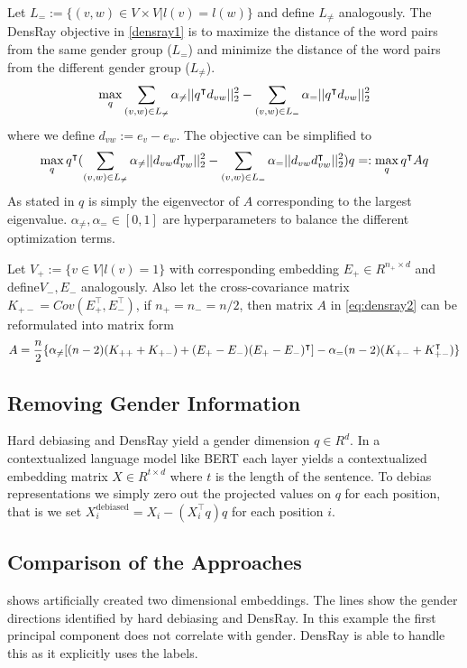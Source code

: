 Let $L_{=}:=\{(v,w)\in V\times V|l(v)=l(w)\}$ and define
$L_{\neq}$ analogously.  The DensRay objective
in \eqref{densray1} is to maximize the distance of the word
pairs from the same gender group ($L_{=}$) and minimize the
distance of the word pairs from the different gender group
($L_{\neq}$).
\begin{eqnarray}
\max\limits_{q} 
\sum_{(v,w)\in L_{\neq}}\alpha_{\neq}||q^\intercal d_{vw}||^2_2
-\sum_{(v,w)\in L_{=}}\alpha_{=}||q^\intercal d_{vw}||^2_2
\eqlabel{densray1}
\end{eqnarray}
where we define $d_{vw}:=e_v-e_w$. The objective can be simplified to 
\begin{eqnarray}
\max \limits_{q} q^\intercal(
\sum_{(v,w)\in L_{\neq}}\alpha_{\neq}||d_{vw}d_{vw}^\intercal ||^2_2-\sum_{(v,w)\in L_{=}}\alpha_{=}||d_{vw}d_{vw}^\intercal ||^2_2)q=:\max\limits_{q} q^\intercal Aq
\eqlabel{eq:densray2}
\end{eqnarray}
As stated in \cite{dufter2019analytical} $q$ is simply the eigenvector of $A$ corresponding to the largest eigenvalue.
$\alpha_{\neq},\alpha_{=}\in [0,1]$ are hyperparameters to balance the different optimization terms. 

Let $V_{+}:=\{v\in V|l(v)=1\}$ with corresponding embedding $E_{+} \in R^{n_+\times d}$ and define$V_{-}, E_{-}$ analogously. Also let the cross-covariance matrix $K_{+-}=Cov(E_{+}^\intercal,E_{-}^\intercal)$, if $n_{+}=n_{-}=n/2$, then matrix $A$ in \eqref{eq:densray2} can be reformulated into matrix form
\begin{eqnarray}
A=\frac{n}{2}\{\alpha_{\neq}[(n-2)(K_{++}+K_{+-})+(E_{+}-E_{-})(E_{+}-E_{-})^\intercal]-\alpha_{=}(n-2)(K_{+-}+K_{+-}^\intercal)\}\nonumber
\eqlabel{eq:densray3}
\end{eqnarray}
\subsection{Removing Gender Information}

Hard debiasing and DensRay yield a gender dimension $q \in R^d$. In a contextualized language model like BERT each layer yields a contextualized embedding matrix $X \in R^{t \times d}$ where $t$ is the length of the sentence. To debias representations we simply zero out the projected values on $q$ for each position, that is we set $X^{\text{debiased}}_i = X_i -  (X_i^\intercal q) q$ for each position $i$.


\subsection{Comparison of the Approaches}
  shows artificially created two dimensional embeddings. The lines show the gender directions identified by hard debiasing and DensRay. In this example
 the first principal component does not correlate with gender. DensRay is able to handle this as it explicitly uses the labels.
 
